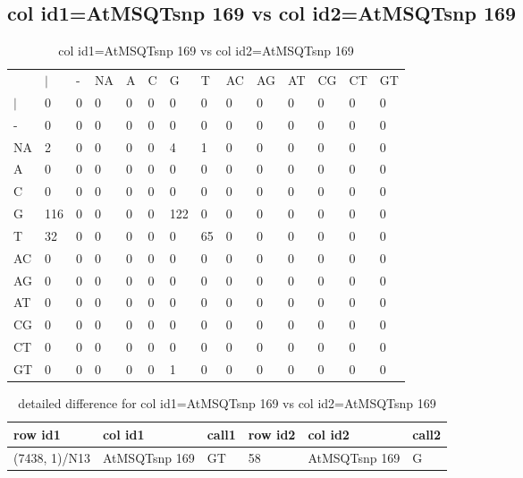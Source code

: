 \subsection{col id1=AtMSQTsnp 169 vs col id2=AtMSQTsnp 169}
\begin{center}
\begin{longtable}{|l|l|l|l|l|l|l|l|l|l|l|l|l|l|}
\caption{col id1=AtMSQTsnp 169 vs col id2=AtMSQTsnp 169} \label{table_dm742}\\
\hline
\\
\hline
&$|$&-&NA&A&C&G&T&AC&AG&AT&CG&CT&GT\\
$|$&0&0&0&0&0&0&0&0&0&0&0&0&0\\
-&0&0&0&0&0&0&0&0&0&0&0&0&0\\
NA&2&0&0&0&0&4&1&0&0&0&0&0&0\\
A&0&0&0&0&0&0&0&0&0&0&0&0&0\\
C&0&0&0&0&0&0&0&0&0&0&0&0&0\\
G&116&0&0&0&0&122&0&0&0&0&0&0&0\\
T&32&0&0&0&0&0&65&0&0&0&0&0&0\\
AC&0&0&0&0&0&0&0&0&0&0&0&0&0\\
AG&0&0&0&0&0&0&0&0&0&0&0&0&0\\
AT&0&0&0&0&0&0&0&0&0&0&0&0&0\\
CG&0&0&0&0&0&0&0&0&0&0&0&0&0\\
CT&0&0&0&0&0&0&0&0&0&0&0&0&0\\
GT&0&0&0&0&0&1&0&0&0&0&0&0&0\\
\hline
\end{longtable}
\end{center}

\begin{center}
\begin{longtable}{|l|l|l|l|l|l|}
\caption{detailed difference for col id1=AtMSQTsnp 169 vs col id2=AtMSQTsnp 169} \label{table_dm743}\\
\hline
row id1&col id1&call1&row id2&col id2&call2\\
\hline
(7438, 1)/N13&AtMSQTsnp 169&GT&58&AtMSQTsnp 169&G\\
\hline
\end{longtable}
\end{center}


